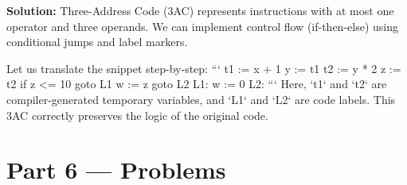 \documentclass[12pt, a4paper]{book}
\begin{document}
\begin{problembox}
\begin{enumerate}[label=\textbf{E\arabic*.}]
        \textbf{Solution:}
        Three-Address Code (3AC) represents instructions with at most one operator and three operands.
        We can implement control flow (if-then-else) using conditional jumps and label markers.
        
        Let us translate the snippet step-by-step:
        ```
          t1 := x + 1
          y := t1
          t2 := y * 2
          z := t2
          if z <= 10 goto L1
          w := z
          goto L2
          L1:
          w := 0
          L2:
        ```
        Here, `t1` and `t2` are compiler-generated temporary variables, and `L1` and `L2` are code labels. This 3AC correctly preserves the logic of the original code.
\end{enumerate}
\end{problembox}

\newpage

\section{Part 6 --- Problems}
\end{document}
